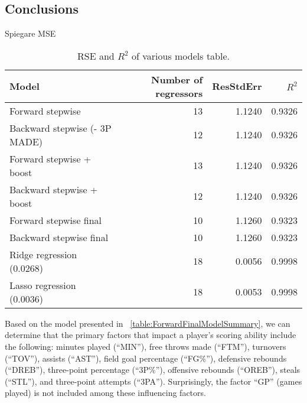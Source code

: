 \subsection{Conclusions}

Spiegare MSE

\begin{table}[H]
	\centering
	\begin{tabular}{|| l | r | r | r ||} 
		\hline
		Model & Number of regressors & ResStdErr & $R^2$ \\
		\hline
		Forward stepwise & 13 & 1.1240 & 0.9326 \\
		\hline
		Backward stepwise (- 3P MADE) & 12 & 1.1240 & 0.9326 \\
		\hline
		Forward stepwise + boost & 13 & 1.1240 & 0.9326 \\
		\hline
		Backward stepwise + boost & 12 & 1.1240 & 0.9326 \\
		\hline
		Forward stepwise final & 10 & 1.1260 & 0.9323 \\
		\hline
		Backward stepwise final & 10 & 1.1260 & 0.9323 \\
		\hline
		Ridge regression (0.0268) & 18 & 0.0056 & 0.9998 \\
		\hline
		Lasso regression (0.0036) & 18 & 0.0053 & 0.9998 \\
		\hline
	\end{tabular}
	\caption{RSE and $R^2$ of various models table.}
	\label{table:RegEvalParams}
\end{table}

Based on the model presented in \Tab~\ref{table:ForwardFinalModelSummary}, we can determine that the primary factors that impact a player's scoring ability include the following: minutes played (``MIN''), free throws made (``FTM''), turnovers (``TOV''), assists (``AST''), field goal percentage (``FG\%''), defensive rebounds (``DREB''), three-point percentage (``3P\%''), offensive rebounds (``OREB''), steals (``STL''), and three-point attempts (``3PA'').
Surprisingly, the factor ``GP'' (games played) is not included among these influencing factors.